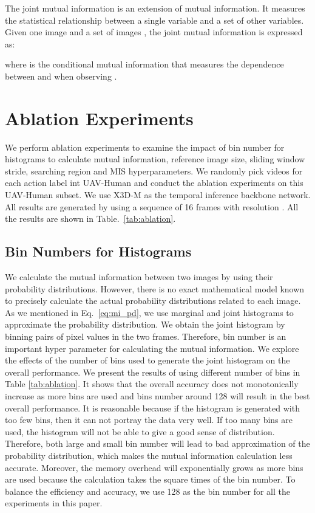 \documentclass[10pt,twocolumn,letterpaper]{article}
\begin{document}
{The joint mutual information is an extension of mutual information. It measures the statistical relationship between a single variable and a set of other variables. Given one image  and a set of images , the joint mutual information is expressed as:

where  is the conditional mutual information that measures the dependence between  and  when observing .



\section{Ablation Experiments}\label{subsec:ablation}
We perform ablation experiments to examine the impact of bin number for histograms to calculate mutual information, reference image size, sliding window stride, searching region and MIS hyperparameters. We randomly pick  videos for each action label int UAV-Human and conduct the ablation experiments on this UAV-Human subset. We use X3D-M\cite{feichtenhofer2020x3d} as the temporal inference backbone network. All results are generated by using a sequence of 16 frames with resolution . All the results are shown in Table.~\ref{tab:ablation}.


\subsection{Bin Numbers for Histograms} 
We calculate the mutual information between two images by using their probability distributions. However, there is no exact mathematical model known to precisely calculate the actual probability distributions related to each image. As we mentioned in Eq.~\ref{eq:mi_pd},  we use marginal and joint histograms to approximate the probability distribution. We obtain the joint histogram by binning pairs of pixel values in the two frames. Therefore, bin number is an important hyper parameter for calculating the mutual information. We explore the effects of the number of bins used to generate the joint histogram on the overall performance. We present the results of using different number of bins in Table \ref{tab:ablation}. It shows that the overall accuracy does not monotonically increase as more bins are used and bins number around 128 will result in the best overall performance. It is reasonable because if the histogram is generated with too few bins, then it can not portray the data very well. If too many bins are used, the histogram will not be able to give a good sense of distribution. Therefore, both large and small bin number will lead to bad approximation of the probability distribution, which makes the mutual information calculation less accurate. Moreover, the memory overhead will exponentially grows as more bins are used because the calculation takes the square times of the bin number. To balance the efficiency and accuracy, we use 128 as the bin number for all the experiments in this paper.

}
\end{document}

